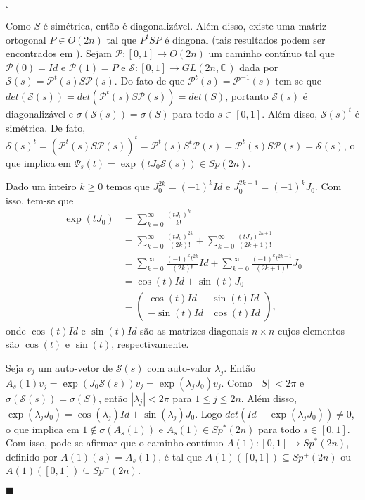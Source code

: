\documentclass[12pt]{book}
\newenvironment{prova}[1]{$\square$ #1}{\hfill$\blacksquare$}
\newcommand{\complexo}[1]{\mathbb{C}^{#1}}
\newcommand{\espectrooperador}[1]{\sigma(#1)}
\newcommand{\estruturacomplexa}{J_{0}}
\newcommand{\generalgroup}[2]{GL(#1, #2)}
\newcommand{\generalgroupcomplexo}[1]{\generalgroup{#1}{\complexo{}}}
\newcommand{\gruposimpletico}[1]{Sp(#1)}
\newcommand{\gruposimpleticonaodegenerado}[1]{Sp^{#1}(2n)}
\newcommand{\intervalo}{[0,1]}
\newcommand{\matrizortogonal}[1]{O(#1)}
\newcommand{\norma}[1]{||#1||}
\begin{document}
\begin{prova}
\begin{enumerate}
			Como $S$ é simétrica, então é diagonalizável. Além disso, existe uma matriz ortogonal $P \in \matrizortogonal{2n}$ tal que $P^{t}SP$ é diagonal (tais resultados podem ser encontrados em \cite{hoffman_kunze}). Sejam $\mathcal{P}:[0,1]\to \matrizortogonal{2n}$ um caminho contínuo tal que $\mathcal{P}(0) = Id$ e $\mathcal{P}(1)=P$ e $\mathcal{S}:\intervalo\to \generalgroupcomplexo{2n}$ dada por $\mathcal{S}(s)=\mathcal{P}^{t}(s)S\mathcal{P}(s)$. Do fato de que $\mathcal{P}^{t}(s)=\mathcal{P}^{-1}(s)$ tem-se que $det(\mathcal{S}(s)) =det(\mathcal{P}^{t}(s)S \mathcal{P}(s)) = det(S)$, portanto $\mathcal{S}(s)$ é diagonalizável e $\espectrooperador{\mathcal{S}(s)} = \espectrooperador{S}$ para todo $s \in [0,1]$. Além disso, $\mathcal{S}(s)^{t}$ é simétrica. De fato, $\mathcal{S}(s)^{t} = (\mathcal{P}^{t}(s)S\mathcal{P}(s))^{t} = \mathcal{P}^{t}(s)S^{t}\mathcal{P}(s) = \mathcal{P}^{t}(s)S\mathcal{P}(s) = \mathcal{S}(s)$, o que implica em $\Psi_{s}(t)=\exp(t\estruturacomplexa \mathcal{S}(s)) \in \gruposimpletico{2n}$.

			Dado um inteiro $k\geq 0$ temos que $\estruturacomplexa^{2k} = (-1)^{k}Id$ e $\estruturacomplexa^{2k+1} = (-1)^{k}\estruturacomplexa$. Com isso, tem-se que
			$$
			\begin{aligned}
			\exp(t\estruturacomplexa ) 
			&= \sum_{k=0}^{\infty}\frac{(t\estruturacomplexa)^{k}}{k!} 
			\\
			&= \sum_{k=0}^{\infty}\frac{(t\estruturacomplexa)^{2k}}{(2k)!} + \sum_{k=0}^{\infty}\frac{(t\estruturacomplexa)^{2k+1}}{(2k+1)!}
			\\
			&=\sum_{k=0}^{\infty}\frac{(-1)^{k} t^{2k} }{(2k)!} Id+ \sum_{k=0}^{\infty}\frac{(-1)^{k} t^{2k+1}}{(2k+1)!}\estruturacomplexa
			\\
			&=\cos(t)Id+\sin(t)\estruturacomplexa
			\\
			&=
			\left(
			\begin{array}{cc}
			\cos(t)Id & \sin(t)Id
			\\
			-\sin(t)Id & \cos(t)Id
			\end{array}
			\right),
			\
			\end{aligned}
			$$
			onde $\cos(t)Id$ e $\sin(t)Id$ são as matrizes diagonais $n \times n$ cujos elementos são $\cos(t)$ e $\sin(t)$, respectivamente.
			
			Seja $v_{j}$ um auto-vetor de $\mathcal{S}(s)$ com auto-valor $\lambda_{j}$. Então $A_{s}(1)v_{j} = \exp(\estruturacomplexa \mathcal{S}(s))v_{j}=\exp(\lambda_{j}\estruturacomplexa )v_{j} $. Como $\norma{S}<2\pi$ e $\espectrooperador{\mathcal{S}(s)} = \espectrooperador{S}$, então $|\lambda_{j}|<2\pi$ para $1\leq j\leq 2n$. Além disso, $\exp(\lambda_{j}\estruturacomplexa ) =\cos(\lambda_{j})Id+\sin(\lambda_{j})\estruturacomplexa$. Logo $det(Id-\exp(\lambda_{j}\estruturacomplexa ) ) \neq 0$, o que implica em $1\notin \espectrooperador{A_{s}(1)}$ e $A_{s}(1) \in \gruposimpleticonaodegenerado{*}$ para todo $s\in \intervalo$. Com isso, pode-se afirmar que o caminho contínuo $A(1):\intervalo\to \gruposimpleticonaodegenerado{*}$, definido por $A(1)(s) = A_{s}(1)$, é tal que $A(1)(\intervalo)\subseteq \gruposimpleticonaodegenerado{+}$ ou $A(1)(\intervalo)\subseteq \gruposimpleticonaodegenerado{-}$.
			

\end{enumerate}
\end{prova}
\end{document}
